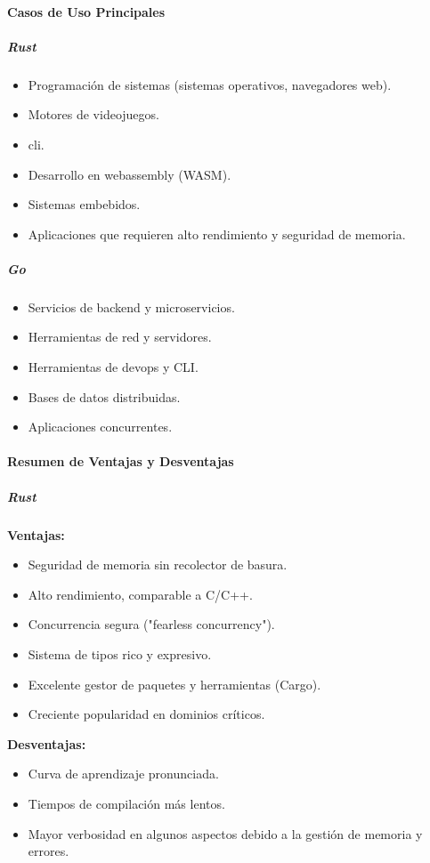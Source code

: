 \paragraph{Casos de Uso Principales}
\subparagraph{Rust}
\begin{itemize}
    \item Programación de sistemas (sistemas operativos, navegadores web).
    \item Motores de videojuegos.
    \item \acrfull{cli}.
    \item Desarrollo en \gls{webassembly} (WASM).
    \item Sistemas embebidos.
    \item Aplicaciones que requieren alto rendimiento y seguridad de memoria.
\end{itemize}

\subparagraph{Go}
\begin{itemize}
    \item Servicios de backend y microservicios.
    \item Herramientas de red y servidores.
    \item Herramientas de \gls{devops} y CLI.
    \item Bases de datos distribuidas.
    \item Aplicaciones concurrentes.
\end{itemize}

\paragraph{Resumen de Ventajas y Desventajas}

\subparagraph{Rust}
\textbf{Ventajas:}
\begin{itemize}
    \item Seguridad de memoria sin recolector de basura.
    \item Alto rendimiento, comparable a C/C++.
    \item Concurrencia segura ("fearless concurrency").
    \item Sistema de tipos rico y expresivo.
    \item Excelente gestor de paquetes y herramientas (Cargo).
    \item Creciente popularidad en dominios críticos.
\end{itemize}
\textbf{Desventajas:}
\begin{itemize}
    \item Curva de aprendizaje pronunciada.
    \item Tiempos de compilación más lentos.
    \item Mayor verbosidad en algunos aspectos debido a la gestión de memoria y errores.
\end{itemize}

